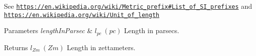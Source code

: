 See \href{https://en.wikipedia.org/wiki/Metric_prefix#List_of_SI_prefixes}{\tt https\+://en.\+wikipedia.\+org/wiki/\+Metric\+\_\+prefix\#\+List\+\_\+of\+\_\+\+S\+I\+\_\+prefixes} and \href{https://en.wikipedia.org/wiki/Unit_of_length}{\tt https\+://en.\+wikipedia.\+org/wiki/\+Unit\+\_\+of\+\_\+length} 
\begin{DoxyParams}{Parameters}
{\em length\+In\+Parsec} & $ l_{pc}\ (pc)$ Length in parsecs. \\
\hline
\end{DoxyParams}
\begin{DoxyReturn}{Returns}
$ l_{Zm}\ (Zm)$ Length in zettameters. 
\end{DoxyReturn}
